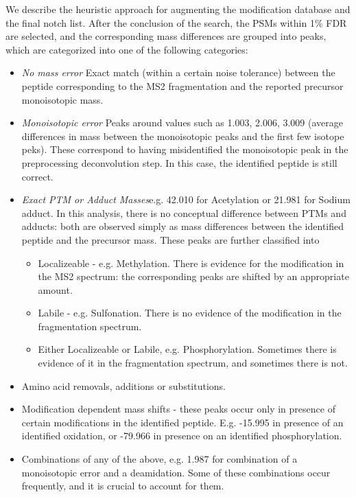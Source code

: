 \documentclass[journal=jprobs,manuscript=article]{achemso}
\begin{document}
We describe the heuristic approach for augmenting the modification database and the final notch list.
After the conclusion of the search, the PSMs within 1\% FDR are selected, and the corresponding mass differences are grouped into peaks, which are categorized into one of the following categories:
\begin{itemize}
\item \textit{No mass error} Exact match (within a certain noise tolerance) between the peptide corresponding to the MS2 fragmentation and the reported precursor monoisotopic mass.
\item \textit{Monoisotopic error} Peaks around values such as 1.003, 2.006, 3.009 (average differences in mass between the monoisotopic peaks and the first few isotope peks). These correspond to having misidentified the monoisotopic peak in the preprocessing deconvolution step. In this case, the identified peptide is still correct. 
\item \textit{Exact PTM or Adduct Masses}e.g. 42.010 for Acetylation or 21.981 for Sodium adduct. In this analysis, there is no conceptual difference between PTMs and adducts: both are observed simply as mass differences between the identified peptide and the precursor mass.  These peaks are further classified into
\begin{itemize}
\item Localizeable - e.g. Methylation. There is evidence for the modification in the MS2 spectrum: the corresponding peaks are shifted by an appropriate amount. 
\item Labile - e.g. Sulfonation. There is no evidence of the modification in the fragmentation spectrum. 
\item Either Localizeable or Labile, e.g. Phosphorylation. Sometimes there is evidence of it in the fragmentation spectrum, and sometimes there is not. 
\end{itemize}
\item Amino acid removals, additions or substitutions.
\item Modification dependent mass shifts - these peaks occur only in presence of certain modifications in the identified peptide. 	E.g. -15.995 in presence of an identified oxidation, or -79.966 in presence on an identified phosphorylation. 
\item Combinations of any of the above, e.g. 1.987 for combination of a monoisotopic error and a deamidation. Some of these combinations occur frequently, and it is crucial to account for them. 
\end{itemize}
\end{document}
